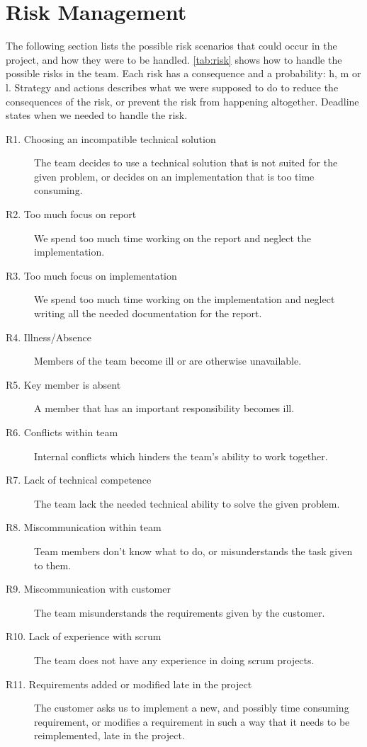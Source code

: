 \section{Risk Management}
\label{sec:plan:risk}
The following section lists the possible risk scenarios that could occur in the project, and how they were to be handled. \autoref{tab:risk} shows how to handle the possible risks in the team. Each risk has a consequence and a probability:  \Gls{h}, \Gls{m} or \Gls{l}.
Strategy and actions describes what we were supposed to do to reduce the consequences of the risk, or prevent the risk from happening altogether. Deadline states when we needed to handle the risk.
\begin{description}
\item[R1. Choosing an incompatible technical solution]  The team decides to use a technical solution that is not suited for the given problem, or decides on an implementation that is too time consuming.
\item[R2. Too much focus on report]  We spend too much time working on the report and neglect the implementation. 
\item[R3. Too much focus on implementation]  We spend too much time working on the implementation and neglect writing all the needed documentation for the report.
\item[R4. Illness/Absence]  Members of the team become ill or are otherwise unavailable. 
\item[R5. Key member is absent] A member that has an important responsibility becomes ill.
\item[R6. Conflicts within team]  Internal conflicts which hinders the team's ability to work together. 
\item[R7. Lack of technical competence]  The team lack the needed technical ability to solve the given problem. 
\item[R8. Miscommunication within team]  Team members don’t know what to do, or misunderstands the task given to them. 
\item[R9. Miscommunication with customer]  The team misunderstands the requirements given by the customer. 
\item[R10. Lack of experience with \Gls{scrum}]  The team does not have any experience in doing \Gls{scrum} projects.
\item[R11. Requirements added or modified late in the project] The customer asks us to implement a new, and possibly time consuming requirement, or modifies a requirement in such a way that it needs to be reimplemented, late in the project.
\end{description}


